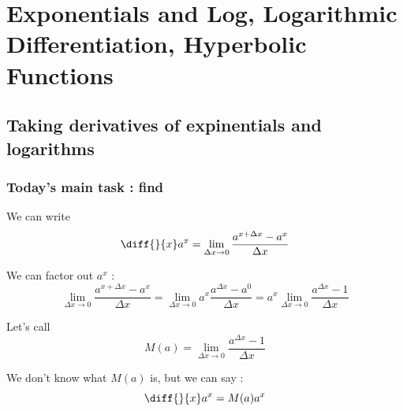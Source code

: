 

\chapter{Exponentials and Log, Logarithmic Differentiation, Hyperbolic Functions}

\bigbreak
\section{Taking derivatives of expinentials and logarithms}

\subsection{Today's main task : find }

We can write $$ \diff{}{x} a^x = \lim_{\Delta x \to 0} \frac{a^{x+\Delta x} - a^x}{\Delta x} $$

We can factor out $a^x$ :
$$ \lim_{\Delta x \to 0} \frac{a^{x+\Delta x}-a^x}{\Delta x}
	= \lim_{\Delta x \to 0} a^x \frac{a^{\Delta x} - a^0}{\Delta x}
	= a^x \lim_{\Delta x \to 0} \frac{a^{\Delta x} - 1}{\Delta x}
$$

Let's call $$ M(a) = \lim_{\Delta x \to 0} \frac{a^{\Delta x} - 1}{\Delta x} $$

We don't know what $M(a)$ is, but we can say : $$ \diff{}{x} a^x = M(a) a^x $$

